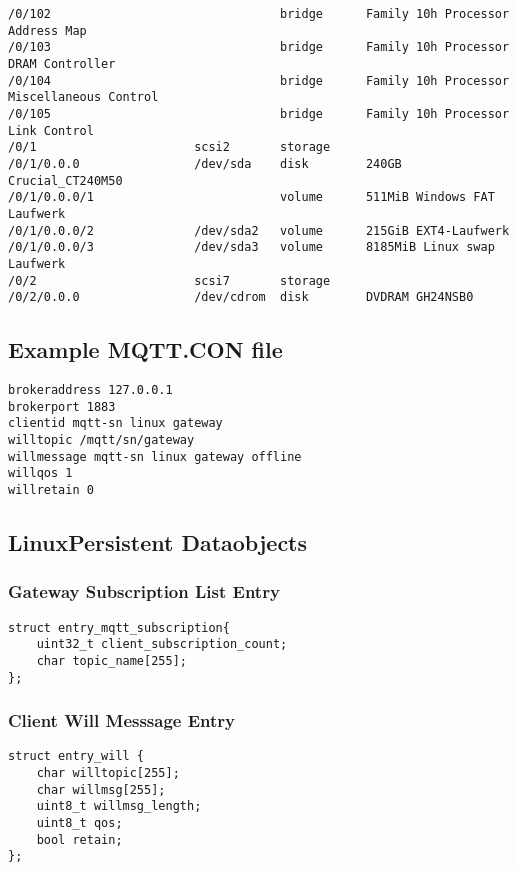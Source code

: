 \begin{small}
\begin{verbatim}
/0/102                                bridge      Family 10h Processor Address Map
/0/103                                bridge      Family 10h Processor DRAM Controller
/0/104                                bridge      Family 10h Processor Miscellaneous Control
/0/105                                bridge      Family 10h Processor Link Control
/0/1                      scsi2       storage     
/0/1/0.0.0                /dev/sda    disk        240GB Crucial_CT240M50
/0/1/0.0.0/1                          volume      511MiB Windows FAT Laufwerk
/0/1/0.0.0/2              /dev/sda2   volume      215GiB EXT4-Laufwerk
/0/1/0.0.0/3              /dev/sda3   volume      8185MiB Linux swap Laufwerk
/0/2                      scsi7       storage     
/0/2/0.0.0                /dev/cdrom  disk        DVDRAM GH24NSB0
\end{verbatim}
\end{small}

\subsection{Example MQTT.CON file}\label{sec:examplemqttconfile}
\begin{small}
\begin{verbatim}
brokeraddress 127.0.0.1
brokerport 1883
clientid mqtt-sn linux gateway
willtopic /mqtt/sn/gateway
willmessage mqtt-sn linux gateway offline
willqos 1
willretain 0
\end{verbatim}
\end{small}

\subsection{LinuxPersistent Dataobjects}
\subsubsection{Gateway Subscription List Entry}\label{sec:gatewaysubscriptionlistentry}
\begin{small}
	\begin{verbatim}
struct entry_mqtt_subscription{
	uint32_t client_subscription_count;
	char topic_name[255];
};
	\end{verbatim}
\end{small}
\subsubsection{Client Will Messsage Entry}\label{sec:willmessageentry}
\begin{small}
	\begin{verbatim}
struct entry_will {
	char willtopic[255];
	char willmsg[255];
	uint8_t willmsg_length;
	uint8_t qos;
	bool retain;
};
	\end{verbatim}
\end{small}
